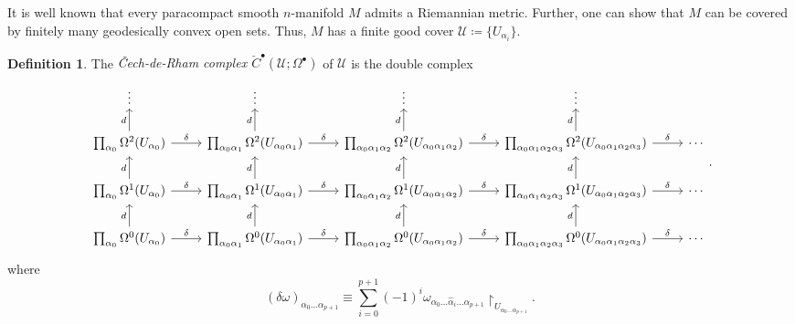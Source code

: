 \documentclass[10pt,letterpaper,cm]{nupset}
\theoremstyle{definition}
\newtheorem{definition}{Definition}[subsection]
\theoremstyle{theorem}
\theoremstyle{remark}
\newcommand{\U}{\mathcal U}
\newcommand{\1}{\mathbb{1}}
\newcommand{\0}{\vec 0}
\begin{document}
It is well known that every paracompact smooth $n$-manifold $M$ admits a Riemannian metric. Further, one can show that $M$ can be covered by finitely many geodesically convex open sets. Thus, $M$ has a finite good cover $\U \coloneqq  \{U_{\alpha_i}\}$.


\begin{definition} 
The \textit{\v{C}ech-de-Rham complex $\check{C}^{\bullet}(\U; \Omega^{\bullet})$} of $\U$ is the double complex
\[
\begin{tikzcd}
\vdots                                                                    & \vdots                                                                                           & \vdots                                                                                                            & \vdots                                                                                                                                   &        \\
\prod_{\alpha_0}\Omega^2(U_{\alpha_0}) \arrow[u, "d"] \arrow[r, "\delta"] & \prod_{\alpha_0{\alpha_1}}\Omega^2(U_{\alpha_0{\alpha_1}}) \arrow[u, "d"] \arrow[r, "\delta"] & \prod_{\alpha_0{\alpha_1{\alpha_2}}}\Omega^2(U_{\alpha_0{\alpha_1{\alpha_2}}}) \arrow[u, "d"] \arrow[r, "\delta"] & \prod_{\alpha_0{\alpha_1{\alpha_2{\alpha_3}}}}\Omega^2(U_{\alpha_0{\alpha_1{\alpha_2}{\alpha_3}}}) \arrow[r, "\delta"] \arrow[u, "d"] & \cdots \\
\prod_{\alpha_0}\Omega^1(U_{\alpha_0}) \arrow[u, "d"] \arrow[r, "\delta"] & \prod_{\alpha_0{\alpha_1}}\Omega^1(U_{\alpha_0{\alpha_1}}) \arrow[u, "d"] \arrow[r, "\delta"] & \prod_{\alpha_0{\alpha_1{\alpha_2}}}\Omega^1(U_{\alpha_0{\alpha_1{\alpha_2}}}) \arrow[u, "d"] \arrow[r, "\delta"] & \prod_{\alpha_0{\alpha_1{\alpha_2{\alpha_3}}}}\Omega^1(U_{\alpha_0{\alpha_1{\alpha_2}{\alpha_3}}}) \arrow[r, "\delta"] \arrow[u, "d"] & \cdots \\
\prod_{\alpha_0}\Omega^0(U_{\alpha_0}) \arrow[r, "\delta"] \arrow[u, "d"] & \prod_{\alpha_0{\alpha_1}}\Omega^0(U_{\alpha_0{\alpha_1}}) \arrow[r, "\delta"] \arrow[u, "d"] & \prod_{\alpha_0{\alpha_1{\alpha_2}}}\Omega^0(U_{\alpha_0{\alpha_1{\alpha_2}}}) \arrow[r, "\delta"] \arrow[u, "d"] & \prod_{\alpha_0{\alpha_1{\alpha_2{\alpha_3}}}}\Omega^0(U_{\alpha_0{\alpha_1{\alpha_2}{\alpha_3}}}) \arrow[r, "\delta"] \arrow[u, "d"] & \cdots
\end{tikzcd}.
\] where  $$\left(\delta{\omega}\right)_{\alpha_0 \ldots \alpha_{p+1}} \equiv \sum_{i=0}^{p+1}({-1})^i\omega_{\alpha_0\ldots \hat{\alpha}_i\ldots \alpha_{p+1}} \restriction_{U_{\alpha_0 \ldots \alpha_{p+1}}}  .$$

\end{definition}
\end{document}
